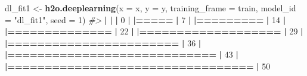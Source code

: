 \documentclass[]{book}
\newenvironment{Shaded}{\begin{snugshade}}{\end{snugshade}}
\newcommand{\CommentTok}[1]{\textcolor[rgb]{0.56,0.35,0.01}{\textit{#1}}}
\newcommand{\DataTypeTok}[1]{\textcolor[rgb]{0.13,0.29,0.53}{#1}}
\newcommand{\DecValTok}[1]{\textcolor[rgb]{0.00,0.00,0.81}{#1}}
\newcommand{\ErrorTok}[1]{\textcolor[rgb]{0.64,0.00,0.00}{\textbf{#1}}}
\newcommand{\KeywordTok}[1]{\textcolor[rgb]{0.13,0.29,0.53}{\textbf{#1}}}
\newcommand{\NormalTok}[1]{#1}
\newcommand{\OperatorTok}[1]{\textcolor[rgb]{0.81,0.36,0.00}{\textbf{#1}}}
\newcommand{\StringTok}[1]{\textcolor[rgb]{0.31,0.60,0.02}{#1}}
\begin{document}
\begin{Shaded}
\begin{Highlighting}[]
\NormalTok{dl_fit1 <-}\StringTok{ }\KeywordTok{h2o.deeplearning}\NormalTok{(}\DataTypeTok{x =}\NormalTok{ x,}
                            \DataTypeTok{y =}\NormalTok{ y,}
                            \DataTypeTok{training_frame =}\NormalTok{ train,}
                            \DataTypeTok{model_id =} \StringTok{"dl_fit1"}\NormalTok{,}
                            \DataTypeTok{seed =} \DecValTok{1}\NormalTok{)}
\CommentTok{#> }
  \OperatorTok{|}\StringTok{                                                                       }
\StringTok{  }\ErrorTok{|}\StringTok{                                                                 }\ErrorTok{|}\StringTok{   }\DecValTok{0}\NormalTok{%}
  \OperatorTok{|}\StringTok{                                                                       }
\StringTok{  }\ErrorTok{|=====}\StringTok{                                                            }\ErrorTok{|}\StringTok{   }\DecValTok{7}\NormalTok{%}
  \OperatorTok{|}\StringTok{                                                                       }
\StringTok{  }\ErrorTok{|=========}\StringTok{                                                        }\ErrorTok{|}\StringTok{  }\DecValTok{14}\NormalTok{%}
  \OperatorTok{|}\StringTok{                                                                       }
\StringTok{  }\ErrorTok{|==============}\StringTok{                                                   }\ErrorTok{|}\StringTok{  }\DecValTok{22}\NormalTok{%}
  \OperatorTok{|}\StringTok{                                                                       }
\StringTok{  }\ErrorTok{|===================}\StringTok{                                              }\ErrorTok{|}\StringTok{  }\DecValTok{29}\NormalTok{%}
  \OperatorTok{|}\StringTok{                                                                       }
\StringTok{  }\ErrorTok{|=======================}\StringTok{                                          }\ErrorTok{|}\StringTok{  }\DecValTok{36}\NormalTok{%}
  \OperatorTok{|}\StringTok{                                                                       }
\StringTok{  }\ErrorTok{|============================}\StringTok{                                     }\ErrorTok{|}\StringTok{  }\DecValTok{43}\NormalTok{%}
  \OperatorTok{|}\StringTok{                                                                       }
\StringTok{  }\ErrorTok{|=================================}\StringTok{                                }\ErrorTok{|}\StringTok{  }\DecValTok{50}\NormalTok{%}
}}}}}}}}
\end{Highlighting}
\end{Shaded}
\end{document}
